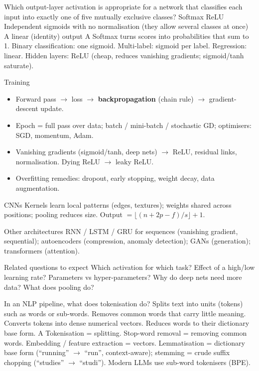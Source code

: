 {Which output-layer activation is appropriate for a network that classifies each input into exactly one of five mutually exclusive classes?}
{Softmax}
{ReLU}
{Independent sigmoids with no normalisation (they allow several classes at once)}
{A linear (identity) output}
{A}
{Softmax turns scores into probabilities that sum to 1. Binary classification: one sigmoid. Multi-label: sigmoid per label. Regression: linear. Hidden layers: ReLU (cheap, reduces vanishing gradients; sigmoid/tanh saturate).}

{\begin{block}{Training}
		\begin{itemize}
			\item Forward pass $\rightarrow$ loss $\rightarrow$ \textbf{backpropagation} (chain rule) $\rightarrow$ gradient-descent update.
			\item Epoch = full pass over data; batch / mini-batch / stochastic GD; optimisers: SGD, momentum, Adam.
			\item Vanishing gradients (sigmoid/tanh, deep nets) $\rightarrow$ ReLU, residual links, normalisation. Dying ReLU $\rightarrow$ leaky ReLU.
			\item Overfitting remedies: dropout, early stopping, weight decay, data augmentation.
\end{itemize}\end{block}}
{\begin{block}{CNNs}
		Kernels learn local patterns (edges, textures); weights shared across positions; pooling reduces size. Output $=\lfloor(n+2p-f)/s\rfloor+1$.
	\end{block}
	\begin{block}{Other architectures}
		RNN / LSTM / GRU for sequences (vanishing gradient, sequential); autoencoders (compression, anomaly detection); GANs (generation); transformers (attention).
	\end{block}
	\begin{alertblock}{Related questions to expect}
		Which activation for which task? Effect of a high/low learning rate? Parameters vs hyper-parameters? Why do deep nets need more data? What does pooling do?
\end{alertblock}}

{In an NLP pipeline, what does tokenisation do?}
{Splits text into units (tokens) such as words or sub-words.}
{Removes common words that carry little meaning.}
{Converts tokens into dense numerical vectors.}
{Reduces words to their dictionary base form.}
{A}
{Tokenisation = splitting. Stop-word removal = removing common words. Embedding / feature extraction = vectors. Lemmatisation = dictionary base form (``running'' $\rightarrow$ ``run'', context-aware); stemming = crude suffix chopping (``studies'' $\rightarrow$ ``studi''). Modern LLMs use sub-word tokenisers (BPE).}

